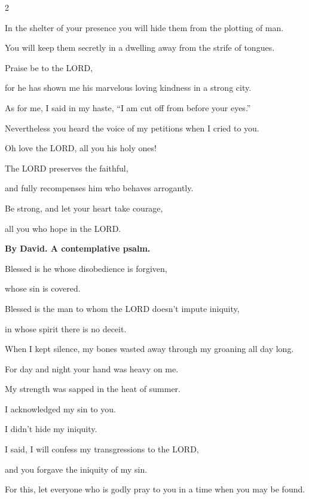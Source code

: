 \begin{multicols}{2}
	
	\myverse{}In the shelter of your presence you will hide them from the
	plotting of man.
	
	You will keep them secretly in a dwelling away from the strife of tongues.
	
	
	\myverse{}Praise be to the LORD,
	
	for he has shown me his marvelous loving kindness in a strong city.
	
	
	\myverse{}As for me, I said in my haste, “I am cut off from before your
	eyes.”
	
	Nevertheless you heard the voice of my petitions when I cried to you.
	
	
	\myverse{}Oh love the LORD, all you his holy ones!
	
	The LORD preserves the faithful,
	
	and fully recompenses him who behaves arrogantly.
	
	
	\myverse{}Be strong, and let your heart take courage,
	
	all you who hope in the LORD.
	
	
	\mychapter{}\textbf{By David. A contemplative psalm.}
	
	\quad \myverse*{}Blessed is he whose disobedience is forgiven,
	
	whose sin is covered.
	
	
	\myverse{}Blessed is the man to whom the LORD doesn’t impute iniquity,
	
	in whose spirit there is no deceit.
	
	
	\myverse{}When I kept silence, my bones wasted away through my groaning
	all day long.
	
	
	\myverse{}For day and night your hand was heavy on me.
	
	My strength was sapped in the heat of summer.
	
	\vspace{\baselineskip}
	
	
	\myverse{}I acknowledged my sin to you.
	
	I didn’t hide my iniquity.
	
	I said, I will confess my transgressions to the LORD,
	
	and you forgave the iniquity of my sin.
	
	\vspace{\baselineskip}
	
	
	\myverse{}For this, let everyone who is godly pray to you in a time when
	you may be found.
	

\end{multicols}
